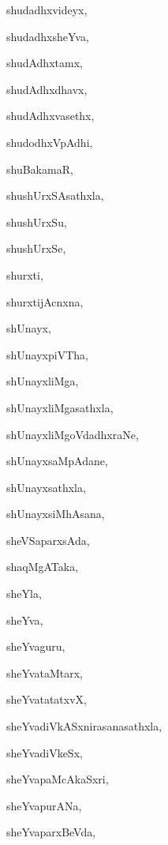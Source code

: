 \begin{multicols}{2}
{shudadhxvideyx}, \pageref{shudadhxvideyx}

{shudadhxsheYva}, \pageref{shudadhxsheYva}

{shudAdhxtamx}, \pageref{shudAdhxtamx}

{shudAdhxdhavx}, \pageref{shudAdhxdhavx}

{shudAdhxvasethx}, \pageref{shudAdhxvasethx}

{shudodhxVpAdhi}, \pageref{shudodhxVpAdhi}

{shuBakamaR}, \pageref{shuBakamaR}

{shushUrxSAsathxla}, \pageref{shushUrxSAsathxla}

{shushUrxSu}, \pageref{shushUrxSu}

{shushUrxSe}, \pageref{shushUrxSe}

{shurxti}, \pageref{shurxti}

{shurxtijAcnxna}, \pageref{shurxtijAcnxna}

{shUnayx}, \pageref{shUnayx}

{shUnayxpiVTha}, \pageref{shUnayxpiVTha}

{shUnayxliMga}, \pageref{shUnayxliMga}

{shUnayxliMgasathxla}, \pageref{shUnayxliMgasathxla}

{shUnayxliMgoVdadhxraNe}, \pageref{shUnayxliMgoVdadhxraNe}

{shUnayxsaMpAdane}, \pageref{shUnayxsaMpAdane}

{shUnayxsathxla}, \pageref{shUnayxsathxla}

{shUnayxsiMhAsana}, \pageref{shUnayxsiMhAsana}

{sheVSaparxsAda}, \pageref{sheVSaparxsAda}

{shaqMgATaka}, \pageref{shaqMgATaka}

{sheYla}, \pageref{sheYla}

{sheYva}, \pageref{sheYva}

{sheYvaguru}, \pageref{sheYvaguru}

{sheYvataMtarx}, \pageref{sheYvataMtarx}

{sheYvatatatxvX}, \pageref{sheYvatatatxvX}

{sheYvadiVkASxnirasanasathxla}, \pageref{sheYvadiVkASxnirasanasathxla}

{sheYvadiVkeSx}, \pageref{sheYvadiVkeSx}

{sheYvapaMcAkaSxri}, \pageref{sheYvapaMcAkaSxri}

{sheYvapurANa}, \pageref{sheYvapurANa}

{sheYvaparxBeVda}, \pageref{sheYvaparxBeVda}


\end{multicols}
